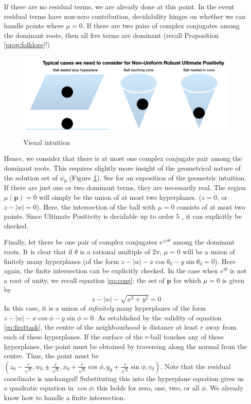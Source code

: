 If there are no residual terms, we are already done at this point. In the event residual terms have non-zero contribution, decidability hinges on whether we can handle points where $\mu = 0$. If there are two pairs of complex conjugates among the dominant roots, then all five terms are dominant (recall Proposition \ref{prop:folklore}!)

\begin{figure}[h]

\includegraphics[width=\textwidth]{picture1.png}
\caption{Visual intuition}
\label{fig:geometricpicture}
\end{figure}

Hence, we consider that there is at most one complex conjugate pair among the dominant roots. This requires slightly more insight of the geometrical nature of the solution set of $\psi_0$ (Figure \ref{fig:geometricpicture}). See \cite{originalstacs,originalarxiv} for an exposition of the geometric intuition. If there are just one or two dominant terms, they are necessarily real. The region $\mu(\mathbf{p}) = 0$ will simply be the union of at most two hyperplanes. ($z = 0$, or $z - |w| = 0$). Here, the intersection of the ball with $\mu = 0$ consists of at most two points. Since Ultimate Positivity is decidable up to order $5$ \cite{joeljames3}, it can explicitly be checked.

Finally, let there be one pair of complex conjugates $e^{\pm i\theta}$ among the dominant roots. It is clear that if $\theta$ is a rational multiple of $2\pi$, $\mu = 0$ will be a union of finitely many hyperplanes (of the form $z - |w| - x\cos \theta_0 - y\sin \theta_0 = 0$). Here again, the finite intersection can be explicitly checked. In the case when $e^{i\theta}$ is not a root of unity, we recall equation \ref{eq:cone}: the set of $\mathbf{p}$ for which $\mu = 0$ is given by
\begin{equation}
z - |w| - \sqrt{x^2 + y^2} = 0
\end{equation}
In this case, it is a union of \textit{infinitely} many hyperplanes of the form $z - |w| - x \cos \phi - y\sin \phi = 0$. As established by the validity of equation \ref{eq:firsttask}, the centre of the neighbourhood is distance at least $r$ away from each of these hyperplanes. If the surface of the $r$-ball touches any of these hyperplanes, the point must be obtained by traversing along the normal from the centre. Thus, the point must be $(z_0 - \frac{r}{\sqrt{3}}, w_0 \pm \frac{r}{\sqrt{3}}, x_0 + \frac{r}{\sqrt{3}}\cos\phi, y_0 +  \frac{r}{\sqrt{3}}\sin\phi, v_0)$. Note that the residual coordinate is unchanged! Substituting this into the hyperplane equation gives us a quadratic equation in $\cos \phi$: this holds for zero, one, two, or all $\phi$. We already know how to handle a finite intersection.


